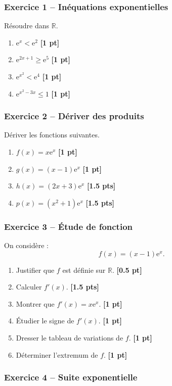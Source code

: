 \documentclass[11pt,a4paper]{article}
\newcommand{\R}{\mathbb{R}}
\newcommand{\e}{\mathrm{e}}
\newcommand{\pts}[1]{\hfill \textbf{[#1 pt]}}
\newcommand{\ptss}[1]{\hfill \textbf{[#1 pts]}}
\begin{document}
\subsubsection*{Exercice 1 -- Inéquations exponentielles}

Résoudre dans $\R$.
\begin{enumerate}
    \item $\e^x<\e^2$ \pts{1}
    \item $\e^{2x+1}\geq \e^5$ \pts{1}
    \item $\e^{x^2}<\e^4$ \pts{1}
    \item $\e^{x^2-3x}\leq 1$ \pts{1}
\end{enumerate}

\subsubsection*{Exercice 2 -- Dériver des produits}

Dériver les fonctions suivantes.
\begin{enumerate}
    \item $f(x)=x\e^x$ \pts{1}
    \item $g(x)=(x-1)\e^x$ \pts{1}
    \item $h(x)=(2x+3)\e^x$ \ptss{1.5}
    \item $p(x)=(x^2+1)\e^x$ \ptss{1.5}
\end{enumerate}

\subsubsection*{Exercice 3 -- Étude de fonction}

On considère :
\[
f(x)=(x-1)\e^x.
\]
\begin{enumerate}
    \item Justifier que $f$ est définie sur $\R$. \pts{0.5}
    \item Calculer $f'(x)$. \ptss{1.5}
    \item Montrer que $f'(x)=x\e^x$. \pts{1}
    \item Étudier le signe de $f'(x)$. \pts{1}
    \item Dresser le tableau de variations de $f$. \pts{1}
    \item Déterminer l'extremum de $f$. \pts{1}
\end{enumerate}

\subsubsection*{Exercice 4 -- Suite exponentielle}
\end{document}
